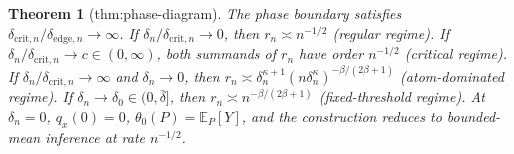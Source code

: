 \documentclass{article}
\newtheorem{theorem}{Theorem}
\begin{document}
\begin{theorem}[thm:phase-diagram]\label{thm:phase-diagram}
The phase boundary satisfies \(\delta_{\mathrm{crit},n}/\delta_{\mathrm{edge},n}\to\infty\). If \(\delta_n/\delta_{\mathrm{crit},n}\to0\), then \(r_n\asymp n^{-1/2}\) (regular regime). If \(\delta_n/\delta_{\mathrm{crit},n}\to c\in(0,\infty)\), both summands of \(r_n\) have order \(n^{-1/2}\) (critical regime). If \(\delta_n/\delta_{\mathrm{crit},n}\to\infty\) and \(\delta_n\to0\), then \(r_n\asymp\delta_n^{\kappa+1}(n\delta_n^\kappa)^{-\beta/(2\beta+1)}\) (atom-dominated regime). If \(\delta_n\to\delta_0\in(0,\bar\delta]\), then \(r_n\asymp n^{-\beta/(2\beta+1)}\) (fixed-threshold regime). At \(\delta_n=0\), \(q_x(0)=0\), \(\theta_0(P)=\mathbb E_P[Y]\), and the construction reduces to bounded-mean inference at rate \(n^{-1/2}\).
\end{theorem}
\end{document}
